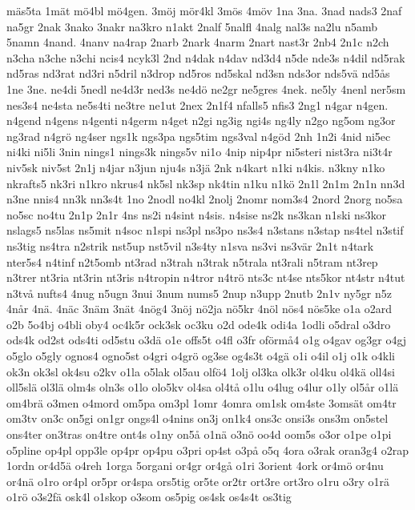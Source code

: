 {m^^e4s5ta
1m^^e4t
m^^f64bl
m^^f64gen.
3m^^f6j
m^^f6r4kl
3m^^f6s
4m^^f6v
1na
3na.
3nad
nads3
2naf
na5gr
2nak
3nako
3nakr
na3kro
n1akt
2nalf
5nalfl
4nalg
nal3s
na2lu
n5amb
5namn
4nand.
4nanv
na4rap
2narb
2nark
4narm
2nart
nast3r
2nb4
2n1c
n2ch
n3cha
n3che
n3chi
ncis4
ncyk3l
2nd
n4dak
n4dav
nd3d4
n5de
nde3s
n4dil
nd5rak
nd5ras
nd3rat
nd3ri
n5dril
n3drop
nd5ros
nd5skal
nd3sn
nds3or
nds5v^^e4
nd5^^e5s
1ne
3ne.
ne4di
5nedl
ne4d3r
ned3s
ne4d^^f6
ne2gr
ne5gres
4nek.
ne5ly
4nenl
ner5sm
nes3s4
ne4sta
ne5s4ti
ne3tre
ne1ut
2nex
2n1f4
nfalls5
nfis3
2ng1
n4gar
n4gen.
n4gend
n4gens
n4genti
n4germ
n4get
n2gi
ng3ig
ngi4s
ng4ly
n2go
ng5om
ng3or
ng3rad
n4gr^^f6
ng4ser
ngs1k
ngs3pa
ngs5tim
ngs3val
n4g^^f6d
2nh
1n2i
4nid
ni5ec
ni4ki
ni5li
3nin
nings1
nings3k
nings5v
ni1o
4nip
nip4pr
ni5steri
nist3ra
ni3t4r
niv5sk
niv5st
2n1j
n4jar
n3jun
nju4s
n3j^^e4
2nk
n4kart
n1ki
n4kis.
n3kny
n1ko
nkrafts5
nk3ri
n1kro
nkrus4
nk5sl
nk3sp
nk4tin
n1ku
n1k^^f6
2n1l
2n1m
2n1n
nn3d
n3ne
nnis4
nn3k
nn3s4t
1no
2nodl
no4kl
2nolj
2nomr
nom3s4
2nord
2norg
no5sa
no5sc
no4tu
2n1p
2n1r
4ns
ns2i
n4sint
n4sis.
n4sise
ns2k
ns3kan
n1ski
ns3kor
nslags5
ns5las
ns5mit
n4soc
n1spi
ns3pl
ns3po
ns3s4
n3stans
n3stap
ns4tel
n3stif
ns3tig
ns4tra
n2strik
nst5up
nst5vil
n3s4ty
n1sva
ns3vi
ns3v^^e4r
2n1t
n4tark
nter5s4
n4tinf
n2t5omb
nt3rad
n3trah
n3trak
n5trala
nt3rali
n5tram
nt3rep
n3trer
nt3ria
nt3rin
nt3ris
n4tropin
n4tror
n4tr^^f6
nts3c
nt4se
nts5kor
nt4str
n4tut
n3tv^^e5
nufts4
4nug
n5ugn
3nui
3num
nums5
2nup
n3upp
2nutb
2n1v
ny5gr
n5z
4n^^e5r
4n^^e4.
4n^^e4c
3n^^e4m
3n^^e4t
4n^^f6g4
3n^^f6j
n^^f62ja
n^^f65kr
4n^^f6l
n^^f6s4
n^^f6s5ke
o1a
o2ard
o2b
5o4bj
o4bli
oby4
oc4k5r
ock3sk
oc3ku
o2d
ode4k
odi4a
1odli
o5dral
o3dro
ods4k
od2st
ods4ti
od5stu
o3d^^e4
o1e
offs5t
o4fl
o3fr
of^^f6rm^^e54
o1g
o4gav
og3gr
o4gj
o5glo
o5gly
ognos4
ogno5st
o4gri
o4gr^^f6
og3se
og4s3t
o4g^^e4
o1i
o4il
o1j
o1k
o4kli
ok3n
ok3sl
ok4su
o2kv
o1la
o5lak
ol5au
olf^^f64
1olj
ol3ka
olk3r
ol4ku
ol4k^^e4
oll4si
oll5sl^^e4
ol3l^^e4
olm4s
oln3s
o1lo
olo5kv
ol4sa
ol4t^^e5
o1lu
o4lug
o4lur
o1ly
ol5^^e5r
o1l^^e4
om4br^^e4
o3men
o4mord
om5pa
om3pl
1omr
4omra
om1sk
om4ste
3oms^^e4t
om4tr
om3tv
on3c
on5gi
on1gr
ongs4l
o4nins
on3j
on1k4
ons3c
onsi3s
ons3m
on5stel
ons4ter
on3tras
on4tre
ont4s
o1ny
on5^^e5
o1n^^e4
o3n^^f6
oo4d
oom5s
o3or
o1pe
o1pi
o5pline
op4pl
opp3le
op4pr
op4pu
o3pri
op4st
o3p^^e5
o5q
4ora
o3rak
oran3g4
o2rap
1ordn
or4d5^^e4
o4reh
1orga
5organi
or4gr
or4g^^e5
o1ri
3orient
4ork
or4m^^f6
or4nu
or4n^^e4
o1ro
or4pl
or5pr
or4spa
ors5tig
or5te
or2tr
ort3re
ort3ro
o1ru
o3ry
o1r^^e4
o1r^^f6
o3s2f^^e4
osk4l
o1skop
o3som
os5pig
os4sk
os4s4t
os3tig
}
